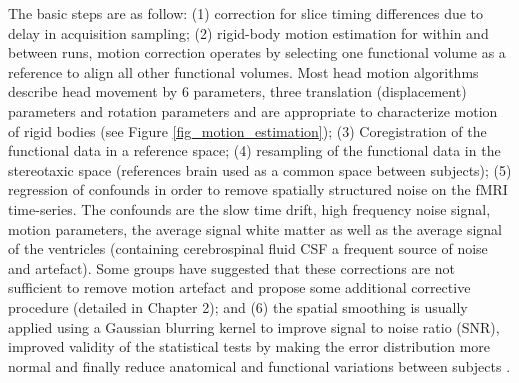 The basic steps are as follow: (1) correction for slice timing differences due to delay in acquisition sampling; (2) rigid-body motion estimation for within and between runs, motion correction operates by selecting one functional volume as a reference to align all other functional volumes. Most head motion algorithms describe head movement by 6 parameters, three translation (displacement) parameters and rotation parameters and are appropriate to characterize motion of rigid bodies (see Figure \ref{fig_motion_estimation}); (3) Coregistration of the functional data in a reference space; (4) resampling of the functional data in the stereotaxic space (references brain used as a common space between subjects); (5) regression of confounds in order to remove spatially structured noise on the fMRI 
time-series. The confounds are the slow time drift, high frequency noise signal, motion parameters, the average signal white matter as well as the average signal of the ventricles (containing cerebrospinal fluid CSF a frequent source of noise and artefact). Some groups have suggested that these corrections are not sufficient to remove motion artefact and propose some additional corrective procedure (detailed in Chapter 2); and (6) the spatial smoothing is usually applied using a Gaussian blurring kernel to improve signal to noise ratio (SNR), improved validity of the statistical tests by making the error distribution more normal and finally reduce anatomical and functional variations between subjects \citep{Worsley1995,Mikl2008}. %

